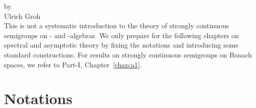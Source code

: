 \setcounter{section}{0}
\label{chap:d1}
\thispagestyle{empty}
{\Large
\vspace*{-.75cm}
by \\[.25em]
Ulrich Groh
\vspace{.75cm}
\\
}
This is not a systematic introduction to the theory of strongly continuous semigroups on \CA- and \WA-algebras.
We only prepare for the following chapters on spectral and asymptotic theory by fixing the notations and introducing some standard constructions.
For results on strongly continuous semigroups on Banach spaces, we refer to Part-I, Chapter~\ref{chap:a1}.
\section{Notations}\label{sec:d1-1}
